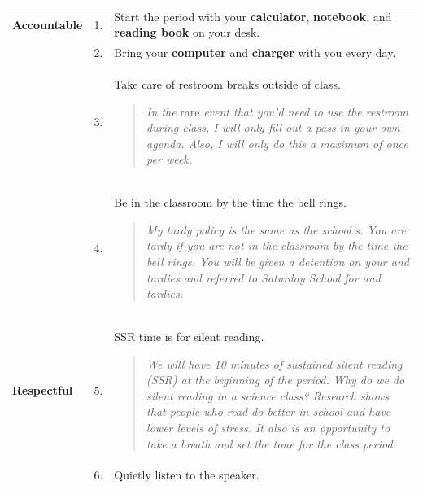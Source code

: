 \documentclass[10pt]{exam}
\newcommand{\mg}{\rowcolor{Goldenrod}}
\begin{document}
\begin{center}
  \begin{tabular}
    {
      p{}
      p{}
      p{}
		}
		
    \hline
      \mg \bf Accountable 
      			&  1. & Start the period with your {\bf calculator}, 
                  {\bf notebook}, and {\bf reading book} on your 
                  desk.
      \\
      \mg   &  2. & Bring your {\bf computer} and {\bf charger} with you
                  every day.
      \\
      \mg 	&  3. & Take care of restroom breaks outside of 
                  class.
                  \vspace{-1em}
                  \begin{quotation}
                  	\noindent\small
										\textit{In the} rare \textit{event that you’d need to use the restroom 
										during class, I will only fill out a pass in your own agenda.  Also, I will 
										only do this a maximum of once per week.}
										\vspace{-1.5em}
                  \end{quotation}

      \\
     	\mg   &  4. & Be in the classroom by the time the bell 
                  rings.
                  \vspace{-1em}
                  \begin{quotation}
                  	\noindent\small
										\textit{My tardy policy is the same as the school’s. You are tardy if you 
										are not in the classroom by the time the bell rings.  You will be given 
										a detention on your \nth{3} and \nth{4} tardies and referred to Saturday School 
										for \nth{5} and \nth{6} tardies.}
										\vspace{-1.5em}
                  \end{quotation}
      \\  
    
    \hline
    \bf Respectful
          &  5. & SSR time is for silent reading.
                 	\vspace{-1em}
                  \begin{quotation}
                  	\noindent\small
										\textit{We will have 10 minutes of sustained silent reading (SSR) 
										at the beginning of the period.  Why do we do silent reading in a 
										science class?  Research shows that people who read do better in 
										school and have lower levels of stress.  It also is an opportunity to 
										take a breath and set the tone for the class period.}
										\vspace{-1.5em}
                  \end{quotation}
          \\   
          &  6. & Quietly listen to the speaker.         
          \\  


\end{tabular}
\end{center}
\end{document}

